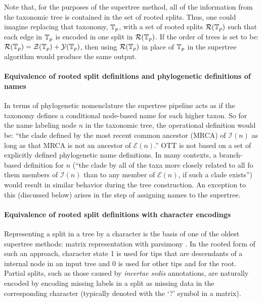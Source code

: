 \documentclass[english]{article}
\begin{document}
Note that, for the purposes of the supertree method, all of the information from
the taxonomic tree is contained in the set of rooted splits. Thus, one could
imagine replacing that taxonomy, $\mbox{\ensuremath{\mathbb{T}}}_{p}$, with a set of rooted splits $\mathcal{R}(\mbox{\ensuremath{\mathbb{T}}}_{p})$ such that
each edge in $\mbox{\ensuremath{\mathbb{T}}}_{p}$ is encoded in one split in $\mathcal{R}(\mbox{\ensuremath{\mathbb{T}}}_{p})$. If the order of trees is set
to be: $\mathcal{R}(\mbox{\ensuremath{\mathbb{T}}}_{p})=\mathcal{Z}(\mbox{\ensuremath{\mathbb{T}}}_{p}) + 
\mathcal{Y}(\mbox{\ensuremath{\mathbb{T}}}_{p})$, then using $\mathcal{R}(\mbox{\ensuremath{\mathbb{T}}}_{p})$ in place of $\mbox{\ensuremath{\mathbb{T}}}_{p}$ in the supertree
algorithm would produce the same output.

\paragraph{Equivalence of rooted split definitions and phylogenetic definitions of names}
In terms of phylogenetic nomenclature the supertree pipeline acts as if the
taxonomy defines a conditional node-based name \citep[see][]{deQueiroz2013} for each
higher taxon.
So for the name labeling node $n$ in the taxonomic
tree, the operational definition would be: ``the clade defined by the most recent
common ancestor (MRCA) of $\mathcal{I}(n)$ as long as that MRCA is not an ancestor of
$\mathcal{E}(n)$.''
OTT is not based on a set of explicitly defined phylogenetic name definitions.
In many contexts, a branch-based definition for $n$ (``the clade by all of the taxa more
closely related to all fo them members of $\mathcal{I}(n)$ than to any member of
$\mathcal{E}(n)$, if such a clade exists'') would result in similar behavior
during the tree construction. 
An exception to this (discussed below) arises in the step of assigning names to the 
    supertree.

\paragraph{Equivalence of rooted split definitions with character encodings}
Representing a split in a tree by a character is the basis of one of the oldest
supertree methods: matrix representation with parsimony \citep[MRP, see][]{Baum1992,Ragan1992}.
In the rooted form of such an approach, character state 1 is used for tips that are
descendants of a internal node in an input tree and 0 is used for other tips and for the root.
Partial splits, such as those caused by \emph{incertae sedis} annotations, are naturally encoded by
encoding missing labels in a split as missing data in the corresponding character
(typically denoted with the `?' symbol in a matrix).
\end{document}
